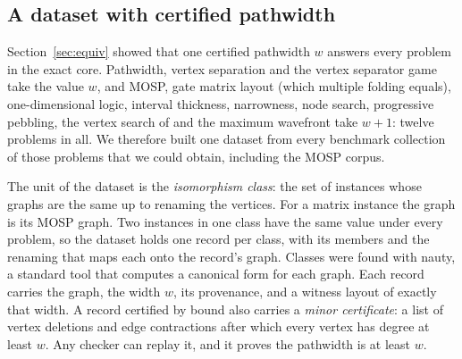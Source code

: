 \subsection{A dataset with certified pathwidth}
\label{sec:dataset}

Section~\ref{sec:equiv} showed that one certified pathwidth $w$ answers every
problem in the exact core. Pathwidth, vertex separation and the vertex
separator game take the value $w$, and MOSP, gate matrix layout (which
multiple folding equals), one-dimensional logic, interval thickness,
narrowness, node search, progressive pebbling, the vertex search of
\citet{BRST1991} and the maximum wavefront take $w+1$: twelve problems in all. We therefore built one dataset from every benchmark collection of
those problems that we could obtain, including the MOSP corpus.

The unit of the dataset is the \emph{isomorphism class}: the set of instances
whose graphs are the same up to renaming the vertices. For a matrix instance
the graph is its MOSP graph. Two instances in one class have the same value
under every problem, so the dataset holds one record per class, with its
members and the renaming that maps each onto the record's graph. Classes were
found with nauty, a standard tool that computes a canonical form for each
graph. Each record carries the graph, the width $w$, its provenance, and a
witness layout of exactly that width. A record certified by bound also carries
a \emph{minor certificate}: a list of vertex deletions and edge contractions
after which every vertex has degree at least $w$. Any checker can replay it,
and it proves the pathwidth is at least $w$.

\begin{table}[t]
\centering\small
\caption{Twenty collections, 21,754 instance files, reduce to 17,714
isomorphism classes, and 16,087 of them have a certified pathwidth. Largely
open: PACE, the VSPLIB grids and Harwell-Boeing, and the MOSP sets of de
Carvalho and Soma and of Frinhani et al.; Rome's 327 open classes are under
3\% of it. \emph{Classes}: isomorphism classes within the
collection (78 graphs above 5,000 vertices are compared by file content only).
\emph{Counted here}: classes whose first member, in the order of the table,
is in this collection, so the column sums to the dataset's class count. The
next four columns split those classes by provenance; \emph{No witnessed
value}: no layout is stored yet. $^{a}$The same 46 files distributed a second
time under other names; every class is counted under its first copy.}
\label{tab:dataset}
\resizebox{\linewidth}{!}{}
\end{table}

